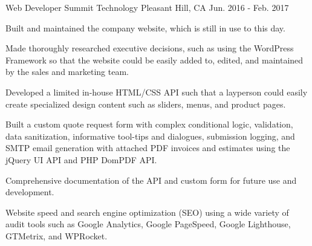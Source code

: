 \begin{cventries}

\cventry
{Web Developer} %
{Summit Technology} %
{Pleasant Hill, CA} %
{Jun. 2016 - Feb. 2017} %
{ %
\begin{cvitems}
\item {Built and maintained the company website, which is still in use to this day.}
\item {Made thoroughly researched executive decisions, such as using the WordPress Framework so that the website could be easily added to, edited, and maintained by the sales and marketing team.}
\item {Developed a limited in-house HTML/CSS API such that a layperson could easily create specialized design content such as sliders, menus, and product pages.}
\item {Built a custom quote request form with complex conditional logic, validation, data sanitization, informative tool-tips and dialogues, submission logging, and SMTP email generation with attached PDF invoices and estimates using the jQuery UI API and PHP DomPDF API.}
\item {Comprehensive documentation of the API and custom form for future use and development.}
\item {Website speed and search engine optimization (SEO) using a wide variety of audit tools such as Google Analytics, Google PageSpeed, Google Lighthouse, GTMetrix, and WPRocket.}
\end{cvitems}
}



\end{cventries}